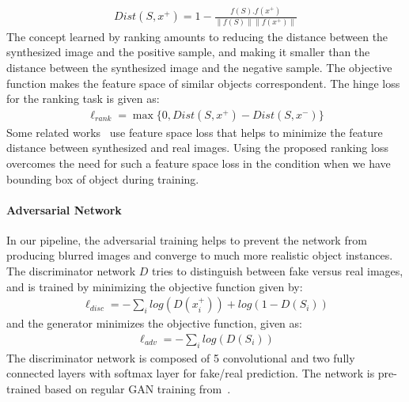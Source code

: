 \documentclass[runningheads]{llncs}
\begin{document}
\begin{equation}
\begin{split}
Dist(S,x^+) = 1 - \frac{f(S).f(x^+)}{\|f(S)\| \|f(x^+)\|}
\end{split}
\label{eq:1}
\end{equation}
The concept learned by ranking amounts to reducing the distance between the synthesized image and the positive sample, and making it smaller than the distance between the synthesized image and the negative sample. The objective function makes the feature space of similar objects correspondent. The hinge loss for the ranking task is given as:
\begin{equation}
\begin{split}
\ell_{rank} = \max\{0, Dist(S,x^+) - Dist(S,x^-)\}
\end{split}
\label{eq:1}
\end{equation}
\noindent Some related works~\cite{dosovitskiy2,nguyen} use feature space loss that helps to minimize the feature distance between synthesized and real images. Using the proposed ranking loss overcomes the need for such a feature space loss in the condition when we have bounding box of object during training.

\iffalse
In our experiments, we observed that using a feature space loss in combination with our ranking loss did not improve the results, with the ranking loss in isolation being the clear winner. The feature loss is given as:
\begin{equation}
\begin{split}
\ell_{feat} = \sum_{i}{\|f(S_{i}) - f(x_{i}^+)\|^2_2 }
\end{split}
\label{eq:1}
\end{equation}
\fi

\paragraph{Adversarial Network}
In our pipeline, the adversarial training helps to prevent the network from producing blurred images and converge to much more realistic object instances. The discriminator network $D$ tries to distinguish between fake versus real images, and is trained by minimizing the objective function given by:
\begin{equation}
\begin{split}
\ell_{disc} = -\sum_{i}{log(D(x_{i}^+)) + log(1-D(S_{i}))}
\end{split}
\label{eq:1}
\end{equation}
and the generator minimizes the objective function, given as:
\begin{equation}
\begin{split}
\ell_{adv} = -\sum_{i}{log(D(S_{i}))}
\end{split}
\label{eq:1}
\end{equation}
The discriminator network is composed of 5 convolutional and two fully connected layers with softmax layer for fake/real prediction. The network is pre-trained based on regular GAN training from~\cite{dosovitskiy2}.
\end{document}
